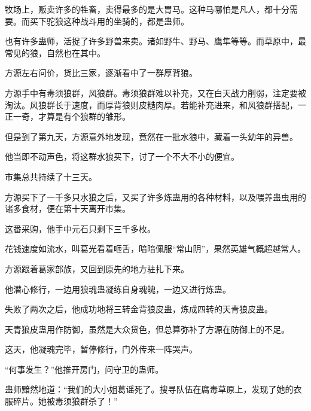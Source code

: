 \begin{this_body}
牧场上，贩卖许多的牲畜，卖得最多的是大胃马。这种马哪怕是凡人，都十分需要。而买下驼狼这种战斗用的坐骑的，都是蛊师。

也有许多蛊师，活捉了许多野兽来卖。诸如野牛、野马、鹰隼等等。而草原中，最常见的狼，自然也在其中。

方源左右问价，货比三家，逐渐看中了一群厚背狼。

方源手中有毒须狼群，风狼群。毒须狼群难以补充，又在白天战力削弱，注定要被淘汰。风狼群长于速度，而厚背狼则皮糙肉厚。若能补充进来，和风狼群搭配，一正一奇，才算是有个狼群的雏形。

但是到了第九天，方源意外地发现，竟然在一批水狼中，藏着一头幼年的异兽。

他当即不动声色，将这群水狼买下，讨了一个不大不小的便宜。

市集总共持续了十三天。

方源买下了一千多只水狼之后，又买了许多炼蛊用的各种材料，以及喂养蛊虫用的诸多食材，便在第十天离开市集。

这番采购，他手中元石只剩下三千多枚。

花钱速度如流水，叫葛光看着咂舌，暗暗佩服“常山阴”，果然英雄气概超越常人。

方源跟着葛家部族，又回到原先的地方驻扎下来。

他潜心修行，一边用狼魂蛊凝练自身魂魄，一边又进行炼蛊。

失败了两次之后，他成功地将三转金背狼皮蛊，炼成四转的天青狼皮蛊。

天青狼皮蛊用作防御，虽然是大众货色，但总算弥补了方源在防御上的不足。

这天，他凝魂完毕，暂停修行，门外传来一阵哭声。

“何事发生？”他推开房门，问守卫的蛊师。

蛊师黯然地道：“我们的大小姐葛谣死了。搜寻队伍在腐毒草原上，发现了她的衣服碎片。她被毒须狼群杀了！”

\end{this_body}

